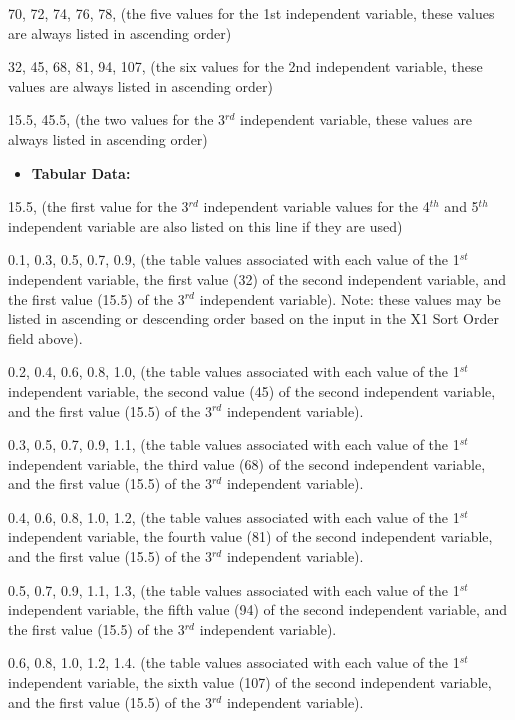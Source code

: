 70, 72, 74, 76, 78, (the five values for the 1st independent variable, these values are always listed in ascending order)

32, 45, 68, 81, 94, 107, (the six values for the 2nd independent variable, these values are always listed in ascending order)

15.5, 45.5, (the two values for the 3\(^{rd}\) independent variable, these values are always listed in ascending order)

\begin{itemize}
\tightlist
\item
  \textbf{Tabular Data:}
\end{itemize}

15.5, (the first value for the 3\(^{rd}\) independent variable values for the 4\(^{th}\) and 5\(^{th}\) independent variable are also listed on this line if they are used)

0.1, 0.3, 0.5, 0.7, 0.9, (the table values associated with each value of the 1\(^{st}\) independent variable, the first value (32) of the second independent variable, and the first value (15.5) of the 3\(^{rd}\) independent variable). Note: these values may be listed in ascending or descending order based on the input in the X1 Sort Order field above).

0.2, 0.4, 0.6, 0.8, 1.0, (the table values associated with each value of the 1\(^{st}\) independent variable, the second value (45) of the second independent variable, and the first value (15.5) of the 3\(^{rd}\) independent variable).

0.3, 0.5, 0.7, 0.9, 1.1, (the table values associated with each value of the 1\(^{st}\) independent variable, the third value (68) of the second independent variable, and the first value (15.5) of the 3\(^{rd}\) independent variable).

0.4, 0.6, 0.8, 1.0, 1.2, (the table values associated with each value of the 1\(^{st}\) independent variable, the fourth value (81) of the second independent variable, and the first value (15.5) of the 3\(^{rd}\) independent variable).

0.5, 0.7, 0.9, 1.1, 1.3, (the table values associated with each value of the 1\(^{st}\) independent variable, the fifth value (94) of the second independent variable, and the first value (15.5) of the 3\(^{rd}\) independent variable).

0.6, 0.8, 1.0, 1.2, 1.4. (the table values associated with each value of the 1\(^{st}\) independent variable, the sixth value (107) of the second independent variable, and the first value (15.5) of the 3\(^{rd}\) independent variable).

